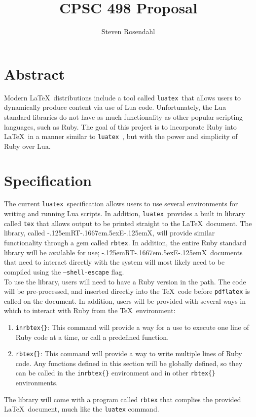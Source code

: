 \documentclass{article}
\title{CPSC 498 Proposal}
\author{Steven Rosendahl}
\date{}
\newcommand{\inlinecode}[1]{\texttt{#1}}
\newcommand{\luatex}{\inlinecode{luatex}\ }
\newcommand{\findent}{\leavevmode{\parindent=1.3em\indent}}
\def\RbTeX{{\rm\kern-.125emR\!{\scriptsize\lower-.5ex\hbox{B}}\!T\kern-.1667em\lower.5ex\hbox{E}\kern-.125emX}}
\begin{document}
\maketitle
\section{Abstract}

Modern \LaTeX\ distributions include a tool called \luatex that allows users to dynamically
produce content via use of Lua code. Unfortunately, the Lua standard libraries do not have as much
functionality as other popular scripting languages, such as Ruby. The goal of this project is to
incorporate Ruby into \LaTeX\ in a manner similar to \luatex, but with the power and
simplicity of Ruby over Lua.

\section{Specification}

\findent The current \luatex specification allows users to use several environments for writing and
running Lua scripts. In addition, \luatex provides a built in library called \inlinecode{tex} that allows
output to be printed straight to the \LaTeX\ document. The library, called \RbTeX, will provide similar
functionality through a gem called \inlinecode{rbtex}. In addition, the entire Ruby standard library will
be available for use; \RbTeX\ documents that need to interact directly with the system will most likely
need to be compiled using the \inlinecode{--shell-escape} flag.\\

To use the library, users will need to have a Ruby version in the path. The code will be pre-processed,
and inserted directly into the \TeX\ code before \inlinecode{pdflatex} is called on the document. In
addition, users will be provided with several ways in which to interact with Ruby from the \TeX\
environment:

\begin{enumerate}
\item \inlinecode{inrbtex\{\}}: This command will provide a way for a use to execute one line of Ruby code
at a time, or call a predefined function.
\item \inlinecode{rbtex\{\}}: This command will provide a way to write multiple lines of Ruby code. Any
functions defined in this section will be globally defined, so they can be called in the
\inlinecode{inrbtex\{\}} environment and in other \inlinecode{rbtex\{\}} environments.
\end{enumerate}

The library will come with a program called \inlinecode{rbtex} that complies the provided \LaTeX\
document, much like the \inlinecode{luatex} command.
\end{document}
